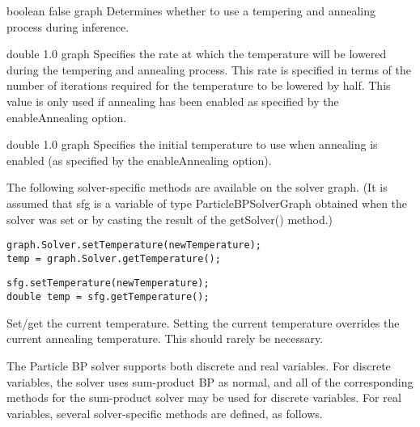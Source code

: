 
{boolean}
{false}
{graph}
{Determines whether to use a tempering and annealing process during inference.}


{double}
{1.0}
{graph}
{Specifies the rate at which the temperature will be lowered during the tempering and annealing process. This rate is specified in terms of the number of iterations required for the temperature to be lowered by half. This value is only used if annealing has been enabled as specified by the enableAnnealing option.}


{double}
{1.0}
{graph}
{Specifies the initial temperature to use when annealing is enabled (as specified by the enableAnnealing option).}


The following solver-specific methods are available on the solver graph. \ifjava (It is assumed that sfg is a variable of type ParticleBPSolverGraph obtained when the solver was set or by casting the result of the getSolver() method.)\fi

\ifmatlab
\begin{lstlisting}
graph.Solver.setTemperature(newTemperature);
temp = graph.Solver.getTemperature();
\end{lstlisting}
\fi

\ifjava
\begin{lstlisting}
sfg.setTemperature(newTemperature);
double temp = sfg.getTemperature();
\end{lstlisting}
\fi

Set/get the current temperature. Setting the current temperature overrides the current annealing temperature. This should rarely be necessary.


The Particle BP solver supports both discrete and real variables. For discrete variables, the solver uses sum-product BP as normal, and all of the corresponding methods for the sum-product solver may be used for discrete variables. For real variables, several solver-specific methods are defined, as follows.

\label{sec:ParticleBPRealVariableSpecificMethods}

